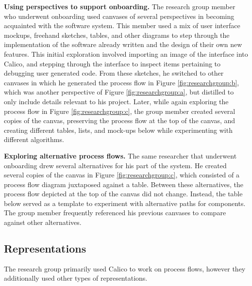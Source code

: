 \documentclass[12pt,fleqn]{ucithesis}
\begin{document}
\textbf{Using perspectives to support onboarding.} The research group member who underwent onboarding used canvases of several perspectives in becoming acquainted with the software system. This member used a mix of user interface mockups, freehand sketches, tables, and other diagrams to step through the implementation of the software already written and the design of their own new features. This initial exploration involved importing an image of the interface into Calico,  and stepping through the interface to inspect items pertaining to debugging user generated code. From these sketches, he switched to other canvases in which he generated the process flow in Figure \ref{fig:researchgroup:b}, which was another perspective of Figure \ref{fig:researchgroup:a}, but distilled to only include details relevant to his project. Later, while again exploring the process flow in Figure \ref{fig:researchgroup:c}, the group member created several copies of the canvas, preserving the process flow at the top of the canvas, and creating different tables, lists, and mock-ups below while experimenting with different algorithms.

\textbf{Exploring alternative process flows.} The same researcher that underwent onboarding drew several alternatives for his part of the system. He created several copies of the canvas in Figure \ref{fig:researchgroup:c}, which consisted of a process flow diagram juxtaposed against a table. Between these alternatives, the process flow depicted at the top of the canvas did not change. Instead, the table below served as a template to experiment with alternative paths for components. The group member frequently referenced his previous canvases to compare against other alternatives.




\subsection{Representations}

The research group primarily used Calico to work on process flows, however they additionally used other types of representations.
\end{document}

